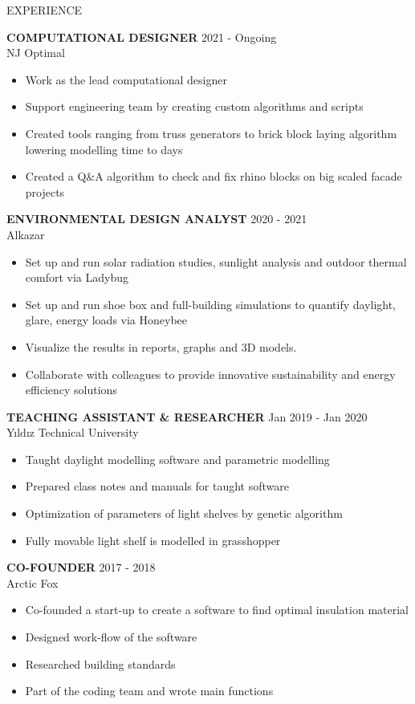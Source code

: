 \documentclass{resume} %
\begin{document}
\begin{rSection}{EXPERIENCE}

\textbf{COMPUTATIONAL DESIGNER} \hfill 2021 - Ongoing\\
NJ Optimal 
 \begin{itemize}
    \itemsep -3pt {} 
     \item Work as the lead computational designer
     \item Support engineering team by creating custom algorithms and scripts
     \item Created tools ranging from truss generators to brick block laying algorithm lowering modelling time to days
     \item Created a Q\&A algorithm to check and fix rhino blocks on big scaled facade projects   
 \end{itemize}

\textbf{ENVIRONMENTAL DESIGN ANALYST} \hfill 2020 - 2021\\
Alkazar \hfill 
 \begin{itemize}
    \itemsep -3pt {} 
     \item Set up and run solar radiation studies, sunlight analysis and outdoor thermal comfort via Ladybug 
     \item Set up and run shoe box and full-building simulations to quantify daylight, glare, energy loads via Honeybee
    \item Visualize the results in reports, graphs and 3D models.
    \item Collaborate with colleagues to provide innovative sustainability and energy efficiency solutions
 \end{itemize}
 
\textbf{TEACHING ASSISTANT \& RESEARCHER} \hfill Jan 2019 - Jan 2020\\
Yıldız Technical University \hfill 
 \begin{itemize}
    \itemsep -3pt {} 
     \item Taught daylight modelling software and parametric modelling
     \item Prepared class notes and manuals for taught software
    \item Optimization of parameters of light shelves by genetic algorithm
    \item Fully movable light shelf is modelled in grasshopper
 \end{itemize}

\textbf{CO-FOUNDER} \hfill 2017 - 2018\\
Arctic Fox \hfill 
 \begin{itemize}
    \itemsep -3pt {} 
     \item Co-founded a start-up to create a software to find optimal
insulation material
     \item Designed work-flow of the software
    \item Researched building standards
    \item Part of the coding team and wrote main functions
 \end{itemize}


\end{rSection} 
\end{document}
